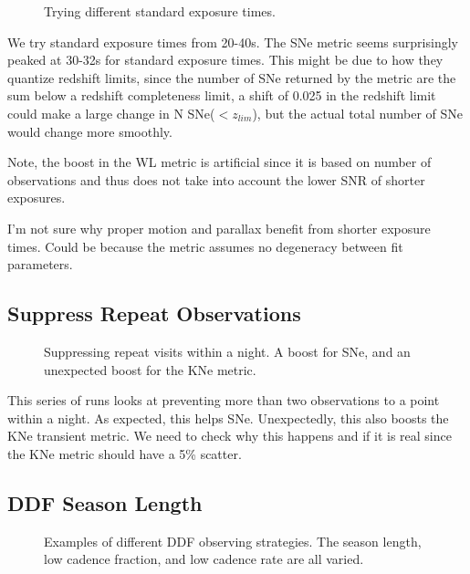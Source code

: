 \begin{figure}
\caption{Trying different standard exposure times.  }
\end{figure}


We try standard exposure times from 20-40s.  The SNe metric seems surprisingly peaked at 30-32s for standard exposure times. This might be due to how they quantize redshift limits, since the number of SNe returned by the metric are the sum below a redshift completeness limit, a shift of 0.025 in the redshift limit could make a large change in N SNe($<z_{lim}$), but the actual total number of SNe would change more smoothly. 

Note, the boost in the WL metric is artificial since it is based on number of observations and thus does not take into account the lower SNR of shorter exposures. 


I'm not sure why proper motion and parallax benefit from shorter exposure times. Could be because the metric assumes no degeneracy between fit parameters. 

\subsection{Suppress Repeat Observations}


\begin{figure}
\caption{Suppressing repeat visits within a night. A boost for SNe, and an unexpected boost for the KNe metric. }
\end{figure}


This series of runs looks at preventing more than two observations to a point within a night. As expected, this helps SNe. Unexpectedly, this also boosts the KNe transient metric. We need to check why this happens and if it is real since the KNe metric should have a 5\% scatter.


\subsection{DDF Season Length}

\begin{figure}
\caption{Examples of different DDF observing strategies. The season length, low cadence fraction, and low cadence rate are all varied. \label{fig:ddf_acourd}}
\end{figure}


